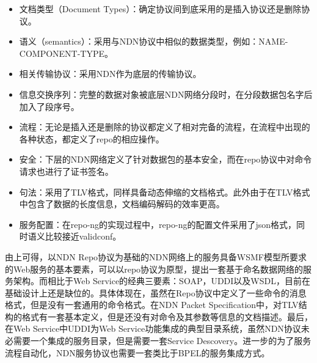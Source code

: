 \begin{itemize}
\item 文档类型（Document Types）：确定协议间到底采用的是插入协议还是删除协议。
\item 语义（semantics）：采用与NDN协议中相似的数据类型，例如：NAME-COMPONENT-TYPE。
\item 相关传输协议：采用NDN作为底层的传输协议。
\item 信息交换序列：完整的数据对象被底层NDN网络分段时，在分段数据包名字后加入了段序号。
\item 流程：无论是插入还是删除的协议都定义了相对完备的流程，在流程中出现的各种状态，都定义了repo的相应操作。
\item 安全：下层的NDN网络定义了针对数据包的基本安全，而在repo协议中对命令请求也进行了证书签名。
\item 句法：采用了TLV格式，同样具备动态伸缩的文档格式。此外由于在TLV格式中包含了数据的长度信息，文档编码解码的效率更高。
\item 服务配置：在repo-ng的实现过程中，repo-ng的配置文件采用了json格式，同时语义比较接近validconf。
\end{itemize}

由上可得，以NDN Repo协议为基础的NDN网络上的服务具备WSMF模型所要求的Web服务的基本要素，可以以repo协议为原型，提出一套基于命名数据网络的服务架构。而相比于Web Service的经典三要素：SOAP，UDDI以及WSDL，目前在基础设计上还是缺位的。具体体现在，虽然在Repo协议中定义了一些命令的消息格式，但是没有一套通用的命令格式。在NDN Packet Specification中，对TLV结构的格式有一套基本定义，但是还没有对命令及其参数等信息的文档描述。最后，在Web Service中UDDI为Web Service功能集成的典型目录系统，虽然NDN协议未必需要一个集成的服务目录，但是需要一套Service Descovery。进一步的为了服务流程自动化，NDN服务协议也需要一套类比于BPEL的服务集成方式。